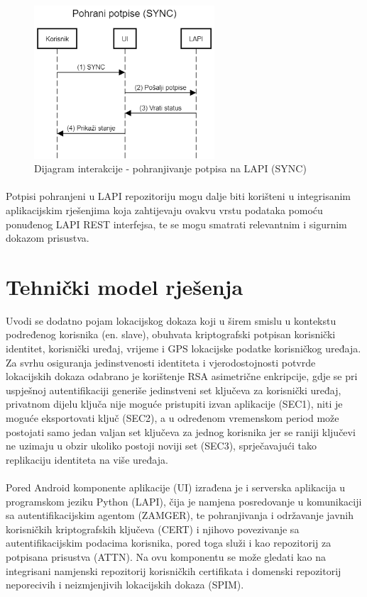 \begin{figure}[H]
    \centering
    \includegraphics[width=0.6\textwidth]{material/dia/04_sync}
    \caption{Dijagram interakcije - pohranjivanje potpisa na LAPI (SYNC)}
\end{figure}
\paragraph*{}
Potpisi pohranjeni u LAPI repozitoriju mogu dalje biti korišteni u integrisanim aplikacijskim rješenjima koja zahtijevaju ovakvu vrstu podataka pomoću ponuđenog LAPI REST interfejsa, te se mogu smatrati relevantnim i sigurnim dokazom prisustva.

\section{Tehnički model rješenja}
Uvodi se dodatno pojam lokacijskog dokaza\cite{locproof} koji u širem smislu u kontekstu podređenog korisnika (en. slave), obuhvata kriptografski potpisan korisnički identitet, korisnički uređaj, vrijeme i GPS lokacijske podatke korisničkog uređaja. Za svrhu osiguranja jedinstvenosti identiteta i vjerodostojnosti potvrde lokacijskih dokaza odabrano je korištenje RSA asimetrične enkripcije, gdje se pri uspješnoj autentifikaciji generiše jedinstveni set ključeva za korisnički uređaj, privatnom dijelu ključa nije moguće pristupiti izvan aplikacije (SEC1), niti je moguće eksportovati ključ (SEC2), a u određenom vremenskom period može postojati samo jedan valjan set ključeva za jednog korisnika jer se raniji ključevi ne uzimaju u obzir ukoliko postoji noviji set (SEC3), sprječavajući tako replikaciju identiteta na više uređaja.

\paragraph*{}
Pored Android komponente aplikacije (UI) izrađena je i serverska aplikacija u programskom jeziku Python (LAPI), čija je namjena posredovanje u komunikaciji sa autentifikacijskim agentom (ZAMGER), te pohranjivanja i održavanje javnih korisničkih kriptografskih ključeva (CERT) i njihovo povezivanje sa autentifikacijskim podacima korisnika, pored toga služi i kao repozitorij za potpisana prisustva (ATTN). Na ovu komponentu se može gledati kao na integrisani namjenski repozitorij korisničkih certifikata i domenski repozitorij neporecivih i neizmjenjivih lokacijskih dokaza (SPIM).

